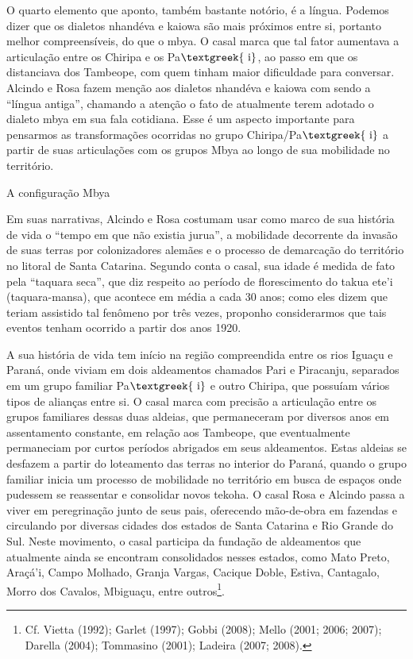\documentclass{article}
\begin{document}
O quarto elemento que aponto, tamb\'em bastante not\'orio, \'e a
l\'ingua. Podemos dizer que os dialetos nhand\'eva e kaiowa s\~ao mais
pr\'oximos entre si, portanto melhor compreens\'iveis, do que o mbya. O
casal marca que tal fator aumentava a articula\c{c}\~ao entre os
Chiripa e os Pa$\text{\textgreek{~i}}$, ao passo em que os distanciava
dos Tambeope, com quem tinham maior dificuldade para conversar. Alcindo
e Rosa fazem men\c{c}\~ao aos dialetos nhand\'eva e kaiowa com sendo a
{\textquotedblleft}l\'ingua antiga{\textquotedblright}, chamando a
aten\c{c}\~ao o fato de atualmente terem adotado o dialeto mbya em sua
fala cotidiana. Esse \'e um aspecto importante para pensarmos as
transforma\c{c}\~oes ocorridas no grupo
Chiripa/Pa$\text{\textgreek{~i}}$ a partir de suas articula\c{c}\~oes
com os grupos Mbya ao longo de sua mobilidade no territ\'orio.

A configura\c{c}\~ao Mbya

Em suas narrativas, Alcindo e Rosa costumam usar como marco de sua
hist\'oria de vida o {\textquotedblleft}tempo em que n\~ao existia
jurua{\textquotedblright}, a mobilidade decorrente da invas\~ao de suas
terras por colonizadores alem\~aes e o processo de demarca\c{c}\~ao do
territ\'orio no litoral de Santa Catarina. Segundo conta o casal, sua
idade \'e medida de fato pela {\textquotedblleft}taquara
seca{\textquotedblright}, que diz respeito ao per\'iodo de
florescimento do takua ete{\textquoteright}i (taquara-mansa), que
acontece em m\'edia a cada 30 anos; como eles dizem que teriam
assistido tal fen\^omeno por tr\^es vezes, proponho considerarmos que
tais eventos tenham ocorrido a partir dos anos 1920.

A sua hist\'oria de vida tem in\'icio na regi\~ao compreendida entre os
rios Igua\c{c}u e Paran\'a, onde viviam em dois aldeamentos chamados
Pari e Piracanju, separados em um grupo familiar
Pa$\text{\textgreek{~i}}$ e outro Chiripa, que possu\'iam v\'arios
tipos de alian\c{c}as entre si. O casal marca com precis\~ao a
articula\c{c}\~ao entre os grupos familiares dessas duas aldeias, que
permaneceram por diversos anos em assentamento constante, em
rela\c{c}\~ao aos Tambeope, que eventualmente permaneciam por curtos
per\'iodos abrigados em seus aldeamentos. Estas aldeias se desfazem a
partir do loteamento das terras no interior do Paran\'a, quando o grupo
familiar inicia um processo de mobilidade no territ\'orio em busca de
espa\c{c}os onde pudessem se reassentar e consolidar novos tekoha. O
casal Rosa e Alcindo passa a viver em peregrina\c{c}\~ao junto de seus
pais, oferecendo m\~ao-de-obra em fazendas e circulando por diversas
cidades dos estados de Santa Catarina e Rio Grande do Sul. Neste
movimento, o casal participa da funda\c{c}\~ao de aldeamentos que
atualmente ainda se encontram consolidados nesses estados, como Mato
Preto, Ara\c{c}\'a{\textquoteright}i, Campo Molhado, Granja Vargas,
Cacique Doble, Estiva, Cantagalo, Morro dos Cavalos, Mbigua\c{c}u,
entre outros\footnote{ Cf. Vietta (1992); Garlet (1997); Gobbi (2008);
Mello (2001; 2006; 2007); Darella (2004); Tommasino (2001); Ladeira
(2007; 2008).}.
\end{document}

